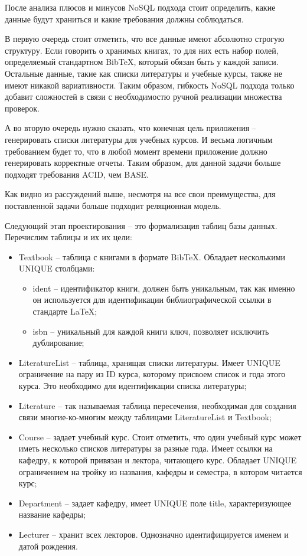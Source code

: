 После анализа плюсов и минусов NoSQL подхода стоит определить, какие данные будут храниться
и какие требования должны соблюдаться.

В первую очередь стоит отметить, что все данные имеют абсолютно строгую структуру. Если говорить
о хранимых книгах, то для них есть набор полей, определяемый стандартном BibTeX, который обязан
быть у каждой записи. Остальные данные, такие как списки литературы и учебные курсы, также не имеют
никакой вариативности. Таким образом, гибкость NoSQL подхода только добавит сложностей в связи
с необходимостю ручной реализации множества проверок.

А во вторую очередь нужно сказать, что конечная цель приложения -- генерировать списки литературы
для учебных курсов. И весьма логичным требованием будет то, что в любой момент времени приложение
должно генерировать корректные отчеты. Таким образом, для данной задачи больше подходят требования
ACID, чем BASE.

Как видно из рассуждений выше, несмотря на все свои преимущества, для поставленной задачи больше
подходит реляционная модель.

Следующий этап проектирования -- это формализация таблиц базы данных. Перечислим таблицы и их
их цели:

\begin{itemize}
    \item Textbook -- таблица с книгами в формате BibTeX. Обладает несколькими UNIQUE столбцами:
        \begin{itemize}
            \item ident -- идентификатор книги, должен быть уникальным, так как именно
                он используется для идентификации библиографической ссылки в стандарте LaTeX;
            \item isbn -- уникальный для каждой книги ключ, позволяет исключить дублирование;
        \end{itemize}
    \item LiteratureList -- таблица, хранящая списки литературы. Имеет UNIQUE ограничение на
        пару из ID курса, которому присвоем список и года этого курса. Это необходимо для
        идентификации списка литературы;
    \item Literature -- так называемая таблица пересечения, необходимая для создания связи
        многие-ко-многим между таблицами LiteratureList и Textbook;
    \item Course -- задает учебный курс. Стоит отметить, что один учебный курс может иметь
        несколько списков литературы за разные года. Имеет ссылки на кафедру, к которой 
        привязан и лектора, читающего курс. Обладает UNIQUE ограничением на тройку из
        названия, кафедры и семестра, в котором читается курс;
    \item Department -- задает кафедру, имеет UNIQUE поле title, характеризующее
        название кафедры;
    \item Lecturer -- хранит всех лекторов. Однозначно идентифицируется именем и датой рождения.
\end{itemize}

